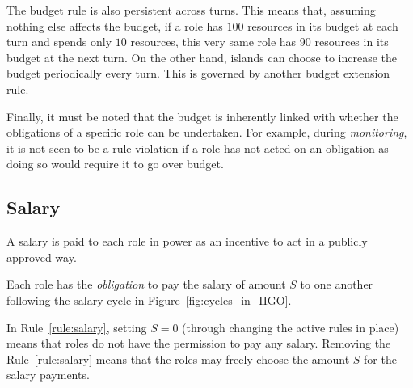 The budget rule is also persistent across turns. This means that, assuming nothing else affects the budget, if a role has $100$ resources in its budget at each turn and spends only $10$ resources, this very same role has $90$ resources in its budget at the next turn. On the other hand, islands can choose to increase the budget periodically every turn. This is governed by another budget extension rule.





Finally, it must be noted that the budget is inherently linked with  whether the obligations of a specific role can be undertaken.
For example, during \emph{monitoring}, it is not seen to be a rule violation if a role has not acted on an obligation as doing so would require it to go over budget.




\subsection{Salary}
\label{subsec:salary}
A salary is paid to each role in power as an incentive to act in a publicly approved way. %
\begin{rule_IIGO} \label{rule:salary}
   Each role has the \emph{obligation} to pay the salary of amount $S$ to one another following the salary cycle in Figure~\ref{fig:cycles_in_IIGO}.
\end{rule_IIGO}

In Rule~\ref{rule:salary}, setting $S=0$ (through changing the active rules in place) means that roles do not have the permission to pay any salary. Removing the Rule~\ref{rule:salary} means that the roles may freely choose the amount $S$ for the salary payments.

